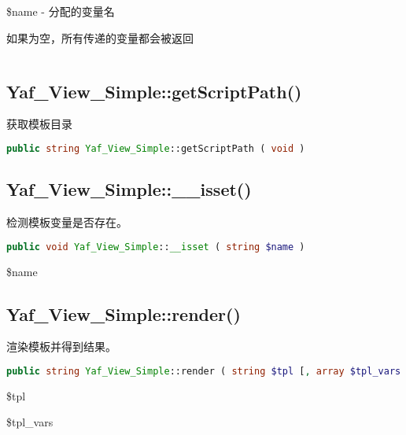 \begin{compactitem}
\item \$name - 分配的变量名

如果为空，所有传递的变量都会被返回

\end{compactitem}



\begin{lstlisting}[language=PHP]

\end{lstlisting}

\subsection{Yaf\_View\_Simple::getScriptPath()}

获取模板目录


\begin{lstlisting}[language=PHP]
public string Yaf_View_Simple::getScriptPath ( void )
\end{lstlisting}





\subsection{Yaf\_View\_Simple::\_\_isset()}

检测模板变量是否存在。

\begin{lstlisting}[language=PHP]
public void Yaf_View_Simple::__isset ( string $name )
\end{lstlisting}

\begin{compactitem}
\item \$name
\end{compactitem}

\subsection{Yaf\_View\_Simple::render()}

渲染模板并得到结果。

\begin{lstlisting}[language=PHP]
public string Yaf_View_Simple::render ( string $tpl [, array $tpl_vars ] )
\end{lstlisting}

\begin{compactitem}
\item \$tpl
\item \$tpl\_vars
\end{compactitem}



